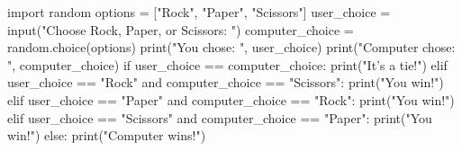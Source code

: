 import random
options = ["Rock", "Paper", "Scissors"]
user_choice = input("Choose Rock, Paper, or Scissors: ")
computer_choice = random.choice(options)
print("You chose: ", user_choice)
print("Computer chose: ", computer_choice)
if user_choice == computer_choice:
    print("It's a tie!")
elif user_choice == "Rock" and computer_choice == "Scissors":
    print("You win!")
elif user_choice == "Paper" and computer_choice == "Rock":
    print("You win!")
elif user_choice == "Scissors" and computer_choice == "Paper":
    print("You win!")
else:
    print("Computer wins!")